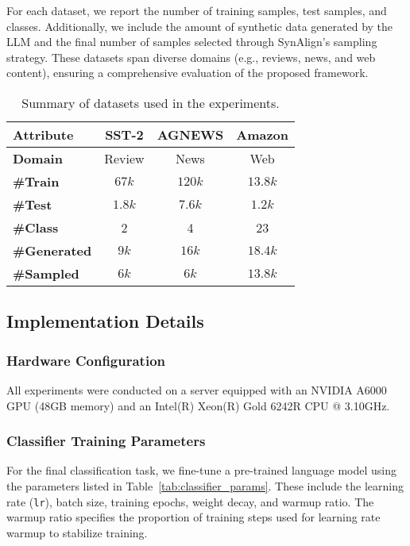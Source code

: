 For each dataset, we report the number of training samples, test samples, and classes. Additionally, we include the amount of synthetic data generated by the LLM and the final number of samples selected through SynAlign's sampling strategy. These datasets span diverse domains (e.g., reviews, news, and web content), ensuring a comprehensive evaluation of the proposed framework.

\begin{table}[bp]
	\centering
	\caption{Summary of datasets used in the experiments.}
	\label{tab:data_info}
	\begin{tabular}{lccc}
		\toprule
		\textbf{Attribute} & \textbf{SST-2} & \textbf{AGNEWS} & \textbf{Amazon} \\
		\midrule
		\textbf{Domain} & Review & News & Web \\
		\textbf{\#Train} & $67k$ & $120k$ & $13.8k$ \\
		\textbf{\#Test} & $1.8k$ & $7.6k$ & $1.2k$ \\
		\textbf{\#Class} & 2 & 4 & 23 \\
		\textbf{\#Generated} & $9k$ & $16k$ & $18.4k$ \\
		\textbf{\#Sampled} & $6k$ & $6k$ & $13.8k$ \\
		\bottomrule
	\end{tabular}
\end{table}

\subsection{Implementation Details}
\label{apdx:imp_detail}

\subsubsection{Hardware Configuration}

All experiments were conducted on a server equipped with an NVIDIA A6000 GPU (48GB memory) and an Intel(R) Xeon(R) Gold 6242R CPU @ 3.10GHz.


\subsubsection{Classifier Training Parameters}

For the final classification task, we fine-tune a pre-trained language model using the parameters listed in Table~\ref{tab:classifier_params}. These include the learning rate (\texttt{lr}), batch size, training epochs, weight decay, and warmup ratio. The warmup ratio specifies the proportion of training steps used for learning rate warmup to stabilize training.

